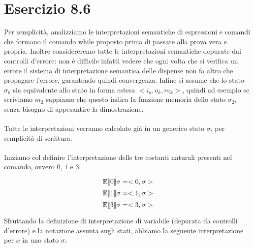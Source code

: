 \section*{Esercizio 8.6}

    
    Per semplicità, analizziamo le interpretazioni semantiche di espressioni e comandi che formano il comando while proposto prima di passare alla prova vera e propria. Inoltre considereremo tutte le interpretazioni semantiche depurate dai controlli d'errore: non è difficile infatti vedere che ogni volta che si verifica un errore il sistema di interpretazione semantica delle dispense non fa altro che propagare l'errore, garantendo quindi convergenza. Infine si assume che lo stato $\sigma_k$ sia equivalente allo stato in forma estesa $<i_k, o_k, m_k>$, quindi ad esempio se scriviamo $m_2$ sappiamo che questo indica la funzione memoria dello stato $\sigma_2$, senza bisogno di appesantire la dimostrazione.\\
    \\
    Tutte le interpretazioni verranno calcolate già in un generico stato $\sigma$, per semplicità di scrittura.\\
    \\
    Iniziamo col definire l'interpretazione delle tre costanti naturali presenti nel comando, ovvero $0$, $1$ e $3$:
    
    \begin{equation*}
        \mathbb{E}\llbracket 0 \rrbracket\sigma = <0, \sigma>
    \end{equation*}
    \begin{equation*}
        \mathbb{E}\llbracket 1 \rrbracket\sigma = <1, \sigma>
    \end{equation*}
    \begin{equation*}
        \mathbb{E}\llbracket 3 \rrbracket\sigma = <3, \sigma>
    \end{equation*}
    
    Sfruttando la definizione di interpretazione di variabile (depurata da controlli d'errore) e la notazione assunta sugli stati, abbiamo la seguente interpretazione per $x$ in uno stato $\sigma$:
    
